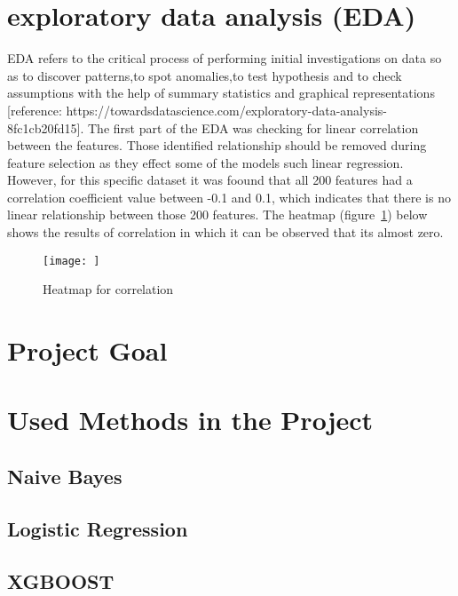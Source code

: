 \documentclass[journal,twoside,web]{ieeecolor}
\begin{document}
\section{exploratory data analysis (EDA)}
EDA refers to the critical process of performing initial investigations on data so as to discover patterns,to spot anomalies,to test hypothesis and to check assumptions with the help of summary statistics and graphical representations [reference: https://towardsdatascience.com/exploratory-data-analysis-8fc1cb20fd15].
The first part of the EDA was checking for linear correlation between the features. Those identified relationship should be removed during feature selection as they effect some of the models such linear regression. However, for this specific dataset it was foound that all 200 features had a correlation coefficient value between -0.1 and 0.1, which indicates that there is no linear relationship between those 200 features. The heatmap (figure~\ref{fig:fig1}) below shows the results of correlation in which it can be observed that its almost zero. 

\begin{figure}[h!]
  \centering
  \texttt{[image: ]}
  \caption{Heatmap for correlation}
  \label{fig:fig1}
\end{figure}



\section{Project Goal}




\section{Used Methods in the Project}


\subsection{Naive Bayes}



\subsection{Logistic Regression}


\subsection{XGBOOST}
\end{document}
